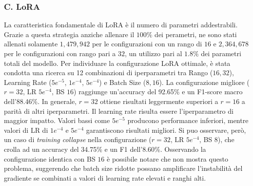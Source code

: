 \documentclass[a4paper,12pt]{article}
\begin{document}
\subsubsection*{C. LoRA}
La caratteristica fondamentale di LoRA è il numero di parametri addestrabili. Grazie a questa strategia anziche allenare il $100\%$ dei perametri, ne sono stati allenati solamente $1,479,942$ per le configurazioni con un rango di $16$ e $2,364,678$ per le configurazioni con rango pari a $32$, un utilizzo pari al $1.8\%$ dei parametri totali del modello.
Per individuare la configurazione LoRA ottimale, è stata condotta una ricerca su 12 combinazioni di iperparametri tra Rango ($16, 32$), Learning Rate ($5e^{-5}$, $1e^{-4}$, $5e^{-4}$) e Batch Size ($8, 16$).
La configurazione migliore ($r=32$, LR $5e^{-4}$, BS $16$) raggiunge un'accuracy del 92.65\% e un F1-score macro dell'88.46\%. In generale, $r=32$ ottiene risultati leggermente superiori a $r=16$ a parità di altri iperparametri.
Il learning rate risulta essere l'iperparametro di maggior impatto. Valori bassi come $5e^{-5}$ producono performance inferiori, mentre valori di LR di $1e^{-4}$ e $5e^{-4}$ garantiscono risultati migliori.
Si puo osservare, però, un caso di \textit{training collapse} nella configurazione ($r=32$, LR $5e^{-4}$, BS $8$), che crolla ad un accuracy del 34.75\% e un F1 dell'8.60\%. Osservando la configurazione identica con BS $16$ è possibile notare che non mostra questo problema, suggerendo che batch size ridotte possano amplificare l'instabilità del gradiente se combinati a valori di learning rate elevati e ranghi alti.
\end{document}
